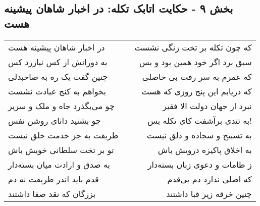 \begin{center}
\section*{بخش ۹ - حکایت اتابک تکله: در اخبار شاهان پیشینه هست}
\label{sec:009}
\begin{longtable}{l p{0.5cm} r}
در اخبار شاهان پیشینه هست
&&
که چون تکله بر تخت زنگی نشست
\\
به دورانش از کس نیازرد کس
&&
سبق برد اگر خود همین بود و بس
\\
چنین گفت یک ره به صاحبدلی
&&
که عمرم به سر رفت بی حاصلی
\\
بخواهم به کنج عبادت نشست
&&
که دریابم این پنج روزی که هست
\\
چو می‌بگذرد جاه و ملک و سریر
&&
نبرد از جهان دولت الا فقیر
\\
چو بشنید دانای روشن نفس
&&
به تندی برآشفت کای تکله بس!
\\
طریقت به جز خدمت خلق نیست
&&
به تسبیح و سجاده و دلق نیست
\\
تو بر تخت سلطانی خویش باش
&&
به اخلاق پاکیزه درویش باش
\\
به صدق و ارادت میان بسته‌دار
&&
ز طامات و دعوی زبان بسته‌دار
\\
قدم باید اندر طریقت نه دم
&&
که اصلی ندارد دم بی‌قدم
\\
بزرگان که نقد صفا داشتند
&&
چنین خرقه زیر قبا داشتند
\\
\end{longtable}
\end{center}

